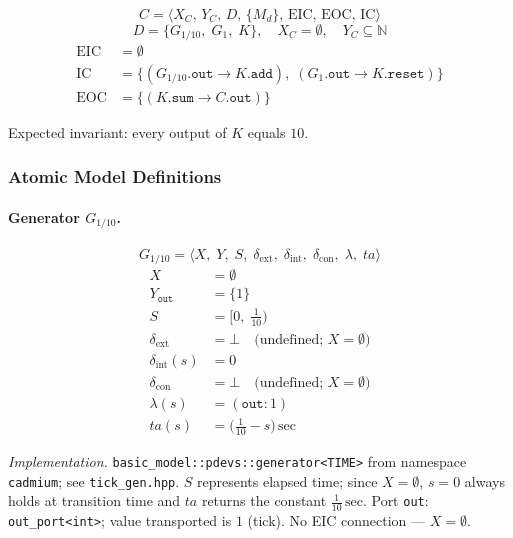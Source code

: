 \[
  C = \langle X_C,\, Y_C,\, D,\, \{M_d\},\, \text{EIC},\, \text{EOC},\, \text{IC} \rangle
\]
\[
  D = \{G_{1/10},\; G_{1},\; K\},\quad X_C = \emptyset,\quad Y_C \subseteq \mathbb{N}
\]
\begin{align*}
  \text{EIC}  &= \emptyset \\
  \text{IC}   &= \{(G_{1/10}.\texttt{out} \to K.\texttt{add}),\;
                   (G_{1}.\texttt{out} \to K.\texttt{reset})\} \\
  \text{EOC}  &= \{(K.\texttt{sum} \to C.\texttt{out})\}
\end{align*}

Expected invariant: every output of $K$ equals $10$.

\subsubsection*{Atomic Model Definitions}

\paragraph{Generator $G_{1/10}$.}

\[
  G_{1/10} = \langle X,\; Y,\; S,\;
               \delta_{\text{ext}},\; \delta_{\text{int}},\; \delta_{\text{con}},\;
               \lambda,\; ta \rangle
\]
\begin{align*}
  X &= \emptyset \\
  Y_{\texttt{out}} &= \{1\} \\
  S &= \bigl[0,\;\tfrac{1}{10}\bigr) \\
  \delta_{\text{ext}} &= \bot
    \quad\text{(undefined; } X = \emptyset\text{)} \\
  \delta_{\text{int}}(s) &= 0 \\
  \delta_{\text{con}} &= \bot
    \quad\text{(undefined; } X = \emptyset\text{)} \\
  \lambda(s) &= (\texttt{out}: 1) \\
  ta(s) &= \bigl(\tfrac{1}{10} - s\bigr)\,\text{sec}
\end{align*}

\noindent\textit{Implementation.}
\texttt{basic\_model::pdevs::generator<TIME>}
from namespace \texttt{cadmium}; see \texttt{tick\_gen.hpp}.
$S$ represents elapsed time; since $X = \emptyset$, $s = 0$ always
holds at transition time and $ta$ returns the constant
$\tfrac{1}{10}\,\text{sec}$.
Port \texttt{out}: \texttt{out\_port<int>}; value transported is $1$ (tick).
No EIC connection --- $X = \emptyset$.

